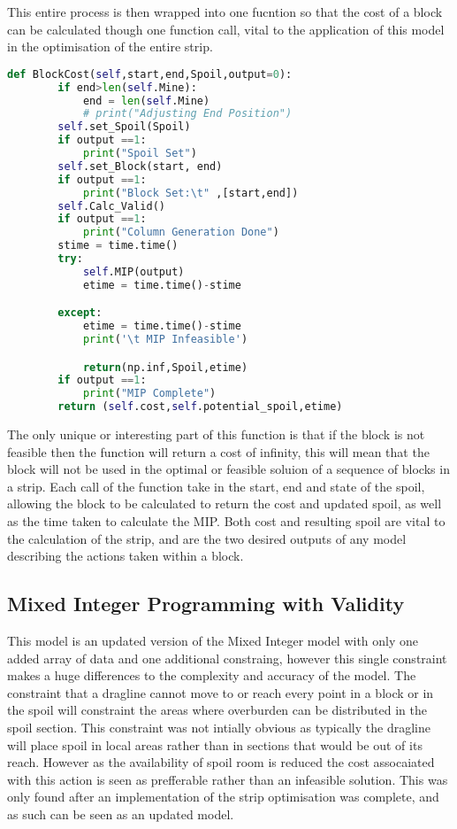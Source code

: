 This entire process is then wrapped into one fucntion so that the cost of a block can be calculated though one function call, vital to the application of this model in the optimisation of the entire strip. 
\begin{lstlisting}[language=python]
	def BlockCost(self,start,end,Spoil,output=0):
		if end>len(self.Mine):
			end = len(self.Mine)
			# print("Adjusting End Position")
		self.set_Spoil(Spoil)
		if output ==1:
			print("Spoil Set")
		self.set_Block(start, end)
		if output ==1:
			print("Block Set:\t" ,[start,end])
		self.Calc_Valid()
		if output ==1:
			print("Column Generation Done")
		stime = time.time()
		try:
			self.MIP(output)
			etime = time.time()-stime

		except:
			etime = time.time()-stime
			print('\t MIP Infeasible')

			return(np.inf,Spoil,etime)
		if output ==1:
			print("MIP Complete")
		return (self.cost,self.potential_spoil,etime)
		\end{lstlisting}
The only unique or interesting part of this function is that if the block is not feasible then the function will return a cost of infinity, this will mean that the block will not be used in the optimal or feasible soluion of a sequence of blocks in a strip. Each call of the function take in the start, end and state of the spoil, allowing the block to be calculated to return the cost and updated spoil, as well as the time taken to calculate the MIP. Both cost and resulting spoil are vital to the calculation of the strip, and are the two desired outputs of any model describing the actions taken within a block. 
\subsection{Mixed Integer Programming with Validity}
This model is an updated version of the Mixed Integer model with only one added array of data and one additional constraing, however this single constraint makes a huge differences to the complexity and accuracy of the model. The constraint that a dragline cannot move to or reach every point in a block or in the spoil will constraint the areas where overburden can be distributed in the spoil section. This constraint was not intially obvious as typically the dragline will place spoil in local areas rather than in sections that would be out of its reach. However as the availability of spoil room is reduced the cost assocaiated with this action is seen as prefferable rather than an infeasible solution. This was only found after an implementation of the strip optimisation was complete, and as such can be seen as an updated model. 
